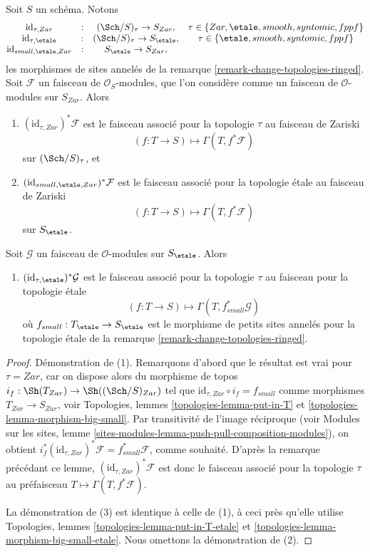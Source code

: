 \begin{lemma}
\label{lemma-compare-sites}
Soit $S$ un schéma. Notons
$$
\begin{matrix}
\text{id}_{\tau, Zar} & : & (\Sch/S)_\tau \to S_{Zar}, &
\tau \in \{Zar, \etale, smooth, syntomic, fppf\} \\
\text{id}_{\tau, \etale} & : &
(\Sch/S)_\tau \to S_\etale, &
\tau \in \{\etale, smooth, syntomic, fppf\} \\
\text{id}_{small, \etale, Zar} & : & S_\etale \to S_{Zar},
\end{matrix}
$$
les morphismes de sites annelés de la
remarque \ref{remark-change-topologies-ringed}.
Soit $\mathcal{F}$ un faisceau de $\mathcal{O}_S$-modules,
que l'on considère comme un faisceau de $\mathcal{O}$-modules sur $S_{Zar}$. Alors
\begin{enumerate}
\item $(\text{id}_{\tau, Zar})^*\mathcal{F}$ est le faisceau associé pour la topologie $\tau$
au faisceau de Zariski
$$
(f : T \to S) \longmapsto \Gamma(T, f^*\mathcal{F})
$$
sur $(\Sch/S)_\tau$, et
\item $(\text{id}_{small, \etale, Zar})^*\mathcal{F}$ est le
faisceau associé pour la topologie \'etale au faisceau de Zariski
$$
(f : T \to S) \longmapsto \Gamma(T, f^*\mathcal{F})
$$
sur $S_\etale$.
\end{enumerate}
Soit $\mathcal{G}$ un faisceau de $\mathcal{O}$-modules
sur $S_\etale$. Alors
\begin{enumerate}
\item[(3)] $(\text{id}_{\tau, \etale})^*\mathcal{G}$ est le
faisceau associé pour la topologie $\tau$ au faisceau pour la topologie \'etale
$$
(f : T \to S) \longmapsto \Gamma(T, f_{small}^*\mathcal{G})
$$
où $f_{small} : T_\etale \to S_\etale$
est le morphisme de petits sites annelés pour la topologie \'etale de la
remarque \ref{remark-change-topologies-ringed}.
\end{enumerate}
\end{lemma}

\begin{proof}
Démonstration de (1). Remarquons d'abord que le résultat est vrai pour $\tau = Zar$,
car on dispose alors du morphisme de topos
$i_f : \Sh(T_{Zar}) \to \Sh((\Sch/S)_{Zar})$
tel que $\text{id}_{\tau, Zar} \circ i_f = f_{small}$ comme morphismes
$T_{Zar} \to S_{Zar}$, voir
Topologies, lemmes \ref{topologies-lemma-put-in-T} et
\ref{topologies-lemma-morphism-big-small}.
Par transitivité de l'image réciproque (voir
Modules sur les sites,
lemme \ref{sites-modules-lemma-push-pull-composition-modules}),
on obtient
$i_f^*(\text{id}_{\tau, Zar})^*\mathcal{F} = f_{small}^*\mathcal{F}$,
comme souhaité. D'après la remarque précédant ce lemme,
$(\text{id}_{\tau, Zar})^*\mathcal{F}$ est donc le faisceau associé pour la topologie $\tau$
au préfaisceau $T \mapsto \Gamma(T, f^*\mathcal{F})$.

\medskip\noindent
La démonstration de (3) est identique à celle de (1), à ceci près qu'elle
utilise
Topologies, lemmes \ref{topologies-lemma-put-in-T-etale} et
\ref{topologies-lemma-morphism-big-small-etale}.
Nous omettons la démonstration de (2).
\end{proof}


